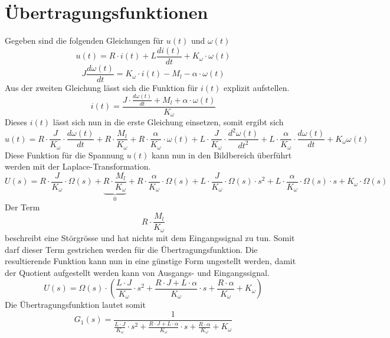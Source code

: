 \section{Übertragungsfunktionen}
Gegeben sind die folgenden Gleichungen für $u(t)$ und $\omega(t)$
\[
	u(t) = R \cdot i(t) + L \frac{di(t)}{dt} + K_\omega \cdot \omega(t)
\]
\[
	J \frac{d\omega(t)}{dt}
	= K_\omega \cdot i(t) - M_l - \alpha \cdot \omega(t)
\]
Aus der zweiten Gleichung lässt sich die Funktion für $i(t)$ explizit
aufstellen.
\[
	i(t)
	= \frac{J \cdot \frac{d\omega(t)}{dt} + M_l
		+ \alpha \cdot \omega(t)}{K_\omega}
\]
Dieses $i(t)$ lässt sich nun in die erste Gleichung einsetzen, somit ergibt
sich
\[
	u(t)
	= R \cdot \frac{J}{K_\omega} \cdot \frac{d\omega(t)}{dt} 
		+ R \cdot \frac{M_l}{K_\omega}
		+ R \cdot \frac{\alpha}{K_\omega} \cdot \omega(t)
		+ L \cdot \frac{J}{K_\omega} \cdot \frac{d^2\omega(t)}{dt^2}
		+ L \cdot \frac{\alpha}{K_\omega} \cdot \frac{d\omega(t)}{dt}
		+ K_\omega \omega(t)
\]
Diese Funktion für die Spannung $u(t)$ kann nun in den Bildbereich überführt
werden mit der Laplace-Transformation.
\[
	U(s)
	= R \cdot \frac{J}{K_\omega} \cdot \Omega(s)
		+ \underbrace{R \cdot \frac{M_l}{K_\omega}}_{0}
		+ R \cdot \frac{\alpha}{K_\omega} \cdot \Omega(s)
		+ L \cdot \frac{J}{K_\omega} \cdot \Omega(s) \cdot s^2
		+ L \cdot \frac{\alpha}{K_\omega} \cdot \Omega(s) \cdot s
		+ K_\omega \cdot \Omega(s)
\]
Der Term
\[ R \cdot \frac{M_l}{K_\omega} \]
beschreibt eine Störgrösse und hat nichts mit dem Eingangssignal zu tun. Somit
darf dieser Term gestrichen werden für die Übertragungsfunktion. Die
resultierende Funktion kann nun in eine günstige Form ungestellt werden, damit
der Quotient aufgestellt werden kann von Ausgangs- und Eingangssignal.
\[
	U(s)
	= \Omega(s) \cdot \left(
		\frac{L \cdot J}{K_\omega} \cdot s^2
		+ \frac{R \cdot J + L \cdot \alpha}{K_\omega} \cdot s 
		+ \frac{R \cdot \alpha}{K_\omega}
		+ K_\omega
	\right)
\]
Die Übertragungsfunktion lautet somit
\[
	G_1(s)
	= \frac{1}{ \frac{L \cdot J}{K_\omega} \cdot s^2
		+ \frac{R \cdot J + L \cdot \alpha}{K_\omega} \cdot s
		+ \frac{R \cdot \alpha}{K_\omega}
		+ K_\omega
	}
\]
